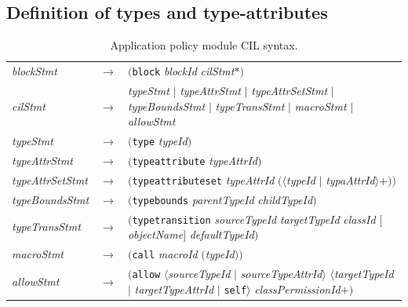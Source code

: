 \subsection{Definition of types and type-attributes}

\begin{table}[t]
	\centering
	\begin{tabularx}{\textwidth}{p{5.8em}p{0.15em}X}
	\textit{blockStmt} & $\to$& $($\texttt{block} \textit{blockId} \textit{cilStmt}$*$$)$ \\

	\textit{cilStmt} & $\to$&  \textit{ typeStmt} $|$
                                  \textit{typeAttrStmt} $|$
                                  \textit{typeAttrSetStmt} $|$
                                  \textit{typeBoundsStmt} $|$
                                  \textit{typeTransStmt} $|$
                                  \textit{macroStmt} $|$
                                  \textit{allowStmt} \\

	\textit{typeStmt} & $\to$ & $($\texttt{type} \textit{typeId}$)$ \\

	\textit{typeAttrStmt} & $\to$& $($\texttt{typeattribute} \textit{typeAttrId}$)$ \\

	\textit{typeAttrSetStmt} & $\to$ & $($\texttt{typeattributeset} \textit{typeAttrId} $($$\langle$\textit{typeId} $|$ \textit{typaAttrId$\rangle$}$+$$)$$)$ \\

	\textit{typeBoundsStmt} & $\to$& $($\texttt{typebounds} \textit{parentTypeId} \textit{childTypeId}$)$ \\

	\textit{typeTransStmt} & $\to$ &  $($\texttt{typetransition} \textit{sourceTypeId} \textit{targetTypeId} \textit{classId} $[$\textit{objectName}$]$ \textit{defaultTypeId}$)$ \\

	\textit{macroStmt} &$\to$ &$($\texttt{call} \textit{macroId} $($\textit{typeId}$)$$)$ \\

	\textit{allowStmt} & $\to$& $($\texttt{allow} $\langle$\textit{sourceTypeId} $|$ \textit{sourceTypeAttrId}$\rangle$  $\langle$\textit{targetTypeId} $|$ \textit{targetTypeAttrId} $|$ \texttt{self}$\rangle$  \textit{classPermissionId}$+$$)$ \\

      \end{tabularx}
        \caption{Application policy module CIL syntax.\protect\footnotemark}
  \label{tab:seapp_syntax}
\end{table}

